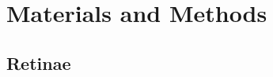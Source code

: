 \documentclass[10pt]{article}
\begin{document}





\section*{Materials and Methods}
\label{retistruct_plos:sec:materials-methods}

\subsection*{Retinae}
\label{retistruct_plos:sec:retinae}
\end{document}

